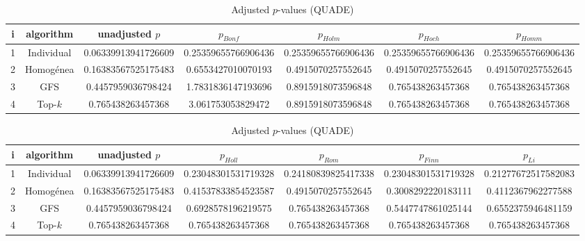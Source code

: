 \documentclass[a4paper,10pt]{article}
\begin{document}
\begin{landscape}
\newpage

\begin{table}[!htp]
\centering\scriptsize
\caption{Adjusted $p$-values (QUADE)}
\begin{tabular}{ccccccc}
i&algorithm&unadjusted $p$&$p_{Bonf}$&$p_{Holm}$&$p_{Hoch}$&$p_{Homm}$\\
\hline
1&Individual&0.06339913941726609&0.25359655766906436&0.25359655766906436&0.25359655766906436&0.25359655766906436\\
2&Homogénea&0.16383567525175483&0.6553427010070193&0.4915070257552645&0.4915070257552645&0.4915070257552645\\
3&GFS&0.4457959036798424&1.7831836147193696&0.8915918073596848&0.765438263457368&0.765438263457368\\
4&Top-$k$&0.765438263457368&3.061753053829472&0.8915918073596848&0.765438263457368&0.765438263457368\\
\hline
\end{tabular}
\end{table}

\begin{table}[!htp]
\centering\scriptsize
\caption{Adjusted $p$-values (QUADE)}
\begin{tabular}{ccccccc}
i&algorithm&unadjusted $p$&$p_{Holl}$&$p_{Rom}$&$p_{Finn}$&$p_{Li}$\\
\hline
1&Individual&0.06339913941726609&0.23048301531719328&0.24180839825417338&0.23048301531719328&0.21277672517582083\\
2&Homogénea&0.16383567525175483&0.41537833854523587&0.4915070257552645&0.3008292220183111&0.4112367962277588\\
3&GFS&0.4457959036798424&0.6928578196219575&0.765438263457368&0.5447747861025144&0.6552375946481159\\
4&Top-$k$&0.765438263457368&0.765438263457368&0.765438263457368&0.765438263457368&0.765438263457368\\
\hline
\end{tabular}
\end{table}

\end{landscape}
\end{document}
